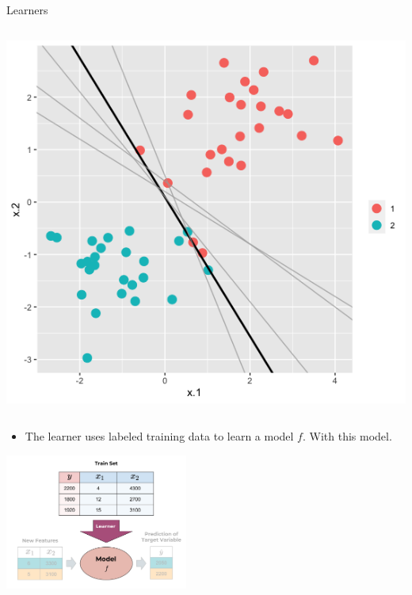 \documentclass[11pt,compress,t,notes=noshow, xcolor=table]{beamer}
\begin{document}
\begin{vbframe}{Learners}
\begin{columns}
\begin{column}{0.3\textwidth}
  \begin{center}
    \includegraphics[width=\textwidth]{slides/ml-basics/figure_man/Model_Classification_Plot.png} 
  \end{center}
\end{column}    
\end{columns}  

\begin{itemize}
\item \small The learner uses labeled training data to learn a model $f$. With this model. 
\end{itemize}

 \begin{center}
    \includegraphics[width = 0.45\textwidth]{figure_man/the_inducer_web.png}
  \end{center}

\end{vbframe}
\end{document}
